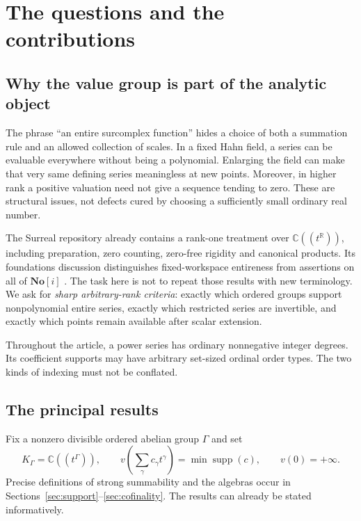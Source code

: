 \documentclass[11pt,letterpaper]{article}
\numberwithin{equation}{section}
\theoremstyle{definition}
\theoremstyle{remark}
\newcommand{\No}{\mathbf{No}}
\newcommand{\C}{\mathbb C}
\newcommand{\R}{\mathbb R}
\newcommand{\supp}{\operatorname{supp}}
\begin{document}
\hypersetup{pageanchor=true}
\tableofcontents
\clearpage
{}

\section{The questions and the contributions}\label{sec:introduction}

\subsection{Why the value group is part of the analytic object}
The phrase ``an entire surcomplex function'' hides a choice of both a summation
rule and an allowed collection of scales. In a fixed Hahn field, a series can
be evaluable everywhere without being a polynomial. Enlarging the field can
make that very same defining series meaningless at new points. Moreover,
in higher rank a positive valuation need not give a sequence tending to zero.
These are structural issues, not defects cured by choosing a sufficiently
small ordinary real number.

The Surreal repository already contains a rank-one treatment over
$\C((t^\R))$, including preparation, zero counting, zero-free rigidity and
canonical products. Its foundations discussion distinguishes fixed-workspace
entireness from assertions on all of $\No[i]$ \cite{RepoMap,RepoRankOne}.
The task here is not to repeat those results with new terminology. We ask for
\emph{sharp arbitrary-rank criteria}: exactly which ordered groups support
nonpolynomial entire series, exactly which restricted series are invertible,
and exactly which points remain available after scalar extension.

Throughout the article, a power series has ordinary nonnegative integer
degrees. Its coefficient supports may have arbitrary set-sized ordinal order
types. The two kinds of indexing must not be conflated.

\subsection{The principal results}
Fix a nonzero divisible ordered abelian group $\Gamma$ and set
\[
 K_\Gamma=\C((t^\Gamma)),\qquad
 v\left(\sum_\gamma c_\gamma t^\gamma\right)=\min\supp(c),\qquad v(0)=+\infty.
\]
Precise definitions of strong summability and the algebras occur in
Sections~\ref{sec:support}--\ref{sec:cofinality}. The results can already be
stated informatively.
\end{document}
